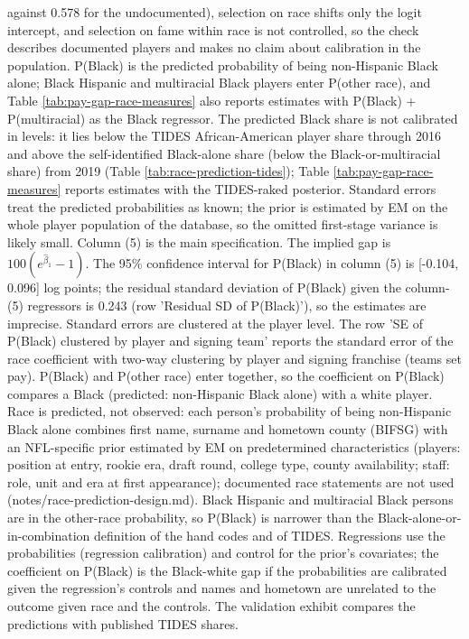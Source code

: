{against 0.578 for the undocumented), selection on race shifts only the logit intercept, and selection on fame within race is not controlled, so the check describes documented players and makes no claim about calibration in the population. P(Black) is the predicted probability of being non-Hispanic Black alone; Black Hispanic and multiracial Black players enter P(other race), and Table \ref{tab:pay-gap-race-measures} also reports estimates with P(Black) + P(multiracial) as the Black regressor. The predicted Black share is not calibrated in levels: it lies below the TIDES African-American player share through 2016 and above the self-identified Black-alone share (below the Black-or-multiracial share) from 2019 (Table \ref{tab:race-prediction-tides}); Table \ref{tab:pay-gap-race-measures} reports estimates with the TIDES-raked posterior. Standard errors treat the predicted probabilities as known; the prior is estimated by EM on the whole player population of the database, so the omitted first-stage variance is likely small. Column (5) is the main specification. The implied gap is $100(e^{\hat\beta_1}-1)$. The 95\% confidence interval for P(Black) in column (5) is [-0.104, 0.096] log points; the residual standard deviation of P(Black) given the column-(5) regressors is 0.243 (row 'Residual SD of P(Black)'), so the estimates are imprecise. Standard errors are clustered at the player level. The row 'SE of P(Black) clustered by player and signing team' reports the standard error of the race coefficient with two-way clustering by player and signing franchise (teams set pay). P(Black) and P(other race) enter together, so the coefficient on P(Black) compares a Black (predicted: non-Hispanic Black alone) with a white player. Race is predicted, not observed: each person's probability of being non-Hispanic Black alone combines first name, surname and hometown county (BIFSG) with an NFL-specific prior estimated by EM on predetermined characteristics (players: position at entry, rookie era, draft round, college type, county availability; staff: role, unit and era at first appearance); documented race statements are not used (notes/race-prediction-design.md). Black Hispanic and multiracial Black persons are in the other-race probability, so P(Black) is narrower than the Black-alone-or-in-combination definition of the hand codes and of TIDES. Regressions use the probabilities (regression calibration) and control for the prior's covariates; the coefficient on P(Black) is the Black-white gap if the probabilities are calibrated given the regression's controls and names and hometown are unrelated to the outcome given race and the controls. The validation exhibit compares the predictions with published TIDES shares.
\par}

